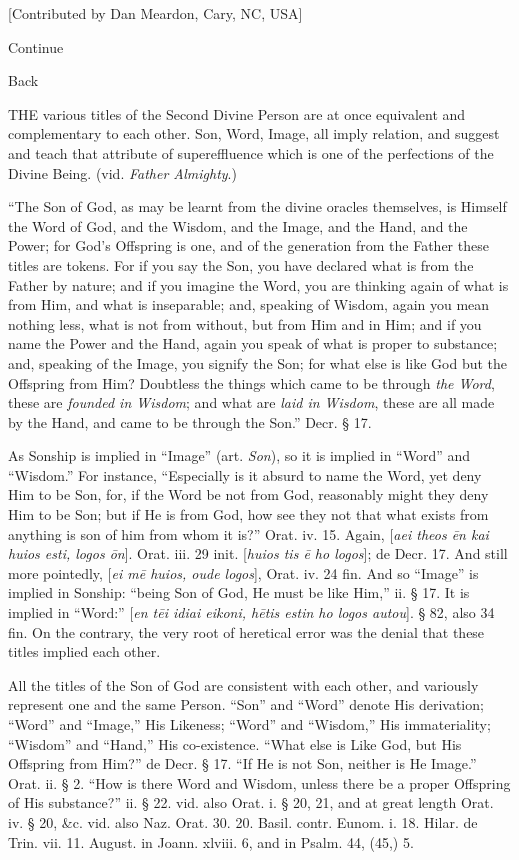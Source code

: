 [Contributed by Dan Meardon, Cary, NC, USA]

Continue

Back

\xsection{[Onomata]}

THE various titles of the Second Divine Person are at once
equivalent and complementary to each other. Son, Word, Image, all
imply relation, and suggest and teach that attribute of supereffluence
which is one of the perfections of the Divine Being. (vid. \emph{Father
Almighty}.)

``The Son of God, as may be learnt from the divine
oracles themselves, is Himself the Word of God, and the Wisdom, and
the Image, and the Hand, and the Power; for God's Offspring is one,
and of the generation from the Father these titles are tokens. For if
you say the Son, you have declared what is from the Father by nature;
and if you imagine the Word, you are thinking again of what is from
Him, and what is inseparable; and, speaking of Wisdom, again you mean
nothing less, what is not from without, but from Him and in Him; and
if you name the Power and the Hand, again you speak of what is proper
to substance; and, speaking of the Image, you signify the Son; for
what else is like God but the Offspring from Him? Doubtless the things
which came to be through \emph{the Word}, these are \emph{founded in
Wisdom}; and what are \emph{laid in Wisdom}, these are all made by
the Hand, and came to be through the Son.'' Decr. § 17.

As Sonship is implied in ``Image'' (art. \emph{Son}),
so it is implied in ``Word'' and ``Wisdom.'' For instance, ``Especially
is it absurd to name the Word, yet deny Him to be Son, for, if the
Word be not from God, reasonably might they deny Him to be Son; but if
He is from God, how see they not that what exists from anything is son
of him from whom it is?'' Orat. iv. 15. Again, [\emph{aei theos \={e}n
kai huios esti, logos \={o}n}]. Orat. iii. 29 init. [\emph{huios
tis \={e} ho logos}]; de Decr. 17. And still more pointedly, [\emph{ei
m\={e} huios, oude logos}], Orat. iv. 24 fin. And so ``Image'' is
implied in Sonship: ``being Son of God, He must be like Him,'' ii. §
17. It is implied in ``Word:'' [\emph{en t\={e}i idiai eikoni, h\={e}tis
estin ho logos autou}]. § 82, also 34 fin. On the contrary, the
very root of heretical error was the denial that these titles implied
each other.

All the titles of the Son of God are consistent
with each other, and variously represent one and the same Person. ``Son''
and ``Word'' denote His derivation; ``Word'' and ``Image,'' His Likeness; ``Word''
and ``Wisdom,'' His immateriality; ``Wisdom'' and ``Hand,'' His
co-existence. ``What else is Like God, but His Offspring from Him?'' de
Decr. § 17. ``If He is not Son, neither is He Image.'' Orat. ii. § 2. ``How
is there Word and Wisdom, unless there be a proper Offspring of His
substance?'' ii. § 22. vid. also Orat. i. § 20, 21, and at great
length Orat. iv. § 20, \&c. vid. also Naz. Orat. 30. 20. Basil.
contr. Eunom. i. 18. Hilar. de Trin. vii. 11. August. in Joann. xlviii.
6, and in Psalm. 44, (45,) 5.


